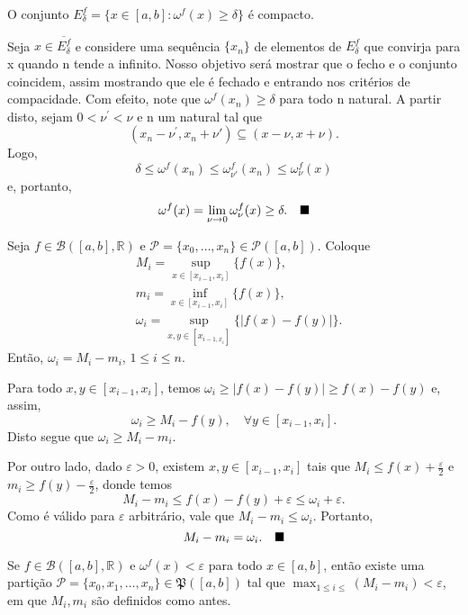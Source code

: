 \documentclass[../analysis_notes.tex]{subfiles}
\begin{document}
\begin{lemma*}
	O conjunto \(E_{\delta }^{f}=\{x\in [a, b]:\omega^{f}(x)\geq \delta \}\) é compacto.
\end{lemma*}
\begin{proof*}
	Seja \(x\in \overline{E _{\delta }^{f}}\) e considere uma sequência \(\{x_{n}\}\) de elementos de \(E_{\delta }^{f}\) que convirja para x quando n tende a infinito. Nosso objetivo será mostrar que o fecho e o conjunto coincidem, assim mostrando que ele é fechado e entrando nos critérios de compacidade.
	Com efeito, note que \(\omega^{f}(x_{n})\geq \delta \) para todo n natural. A partir disto, sejam \(0<\nu^{'}<\nu\) e n um natural tal que
	\[
		(x_{n}-\nu^{'},x_{n}+\nu')\subseteq (x-\nu, x+\nu).
	\]
	Logo,
	\[
		\delta \leq \omega^{f}(x_{n}) \leq \omega_{\nu'}^{f}(x_{n}) \leq \omega_{\nu}^{f}(x)
	\]
	e, portanto,
	\[
		\omega^{f}(x)=\lim_{\nu\to 0}\omega_{\nu}^{f}(x)\geq \delta. \quad \text{$\blacksquare$}
	\]
\end{proof*}
\begin{lemma*}
	Seja \(f\in \mathcal{B}([a, b], \mathbb{R})\) e \(\mathcal{P}=\{x_{0}, \dotsc, x_{n}\}\in \mathcal{P}([a, b])\). Coloque
	\begin{align*}
		 & M_{i}=\sup_{x\in[x_{i-1}, x_{i}]}\{f(x)\},                \\
		 & m_{i}=\inf_{x\in[x_{i-1}, x_{i}]}\{f(x)\},                \\
		 & \omega_{i}=\sup_{x, y\in[x_{i-1, x_{i}}]}\{|f(x)-f(y)|\}.
	\end{align*}
	Então, \(\omega_{i}=M_{i}-m_{i}\), \(1\leq i\leq n.\)
\end{lemma*}
\begin{proof*}
	Para todo \(x, y\in[x_{i-1}, x_{i}]\), temos \(\omega_{i}\geq |f(x)-f(y)|\geq f(x)-f(y)\) e, assim,
	\[
		\omega_{i}\geq M_{i}-f(y), \quad \forall y\in[x_{i-1}, x_{i}].
	\]
	Disto segue que \(\omega_{i}\geq M_{i}-m_{i}.\)

	Por outro lado, dado \(\varepsilon > 0\), existem \(x, y\in [x_{i-1}, x_{i}]\) tais que \(M_{i}\leq f(x)+\frac{\varepsilon }{2}\) e \(m_{i}\geq f(y)-\frac{\varepsilon }{2}\), donde temos
	\[
		M_{i}-m_{i}\leq f(x)-f(y)+\varepsilon \leq \omega_{i}+\varepsilon.
	\]
	Como é válido para \(\varepsilon \) arbitrário, vale que \(M_{i}-m_{i}\leq \omega_{i}\). Portanto,
	\[
		M_{i}-m_{i}=\omega_{i}.\quad \text{$\blacksquare$}
	\]
\end{proof*}
\begin{theorem*}
	Se \(f\in \mathcal{B}([a, b], \mathbb{R})\) e \(\omega^{f}(x)<\varepsilon \) para todo \(x\in[a, b]\), então existe uma partição \(\mathcal{P}=\{x_{0}, x_{1}, \dotsc , x_{n}\}\in \mathfrak{P}([a, b])\) tal que \(\max_{1\leq i\leq }(M_{i}-m_{i})<\varepsilon \), em que \(M_{i}, m_{i}\) são definidos como antes.
\end{theorem*}
\end{document}
